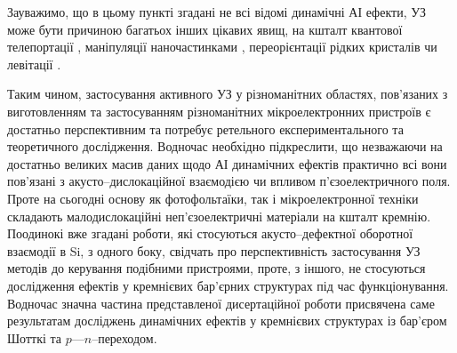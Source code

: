









Зауважимо, що в цьому пункті згадані не всі відомі динамічні АІ ефекти,
УЗ може бути причиною багатьох інших цікавих явищ, на кшталт квантової телепортації \cite{Buscemi}, маніпуляції наночастинками \cite{Cuberes,Olikh:SPQEO2010}, переорієнтації рідких кристалів \cite{US:levit} чи левітації \cite{US:levit}.

Таким чином, застосування активного УЗ у різноманітних областях, пов'язаних з виготовленням та застосуванням різноманітних мікроелектронних пристроїв є достатньо перспективним та потребує ретельного експериментального та теоретичного дослідження.
Водночас необхідно підкреслити, що незважаючи на достатньо великих масив даних щодо АІ динамічних ефектів практично всі вони пов'язані з акусто--дислокаційної взаємодією чи впливом п'єзоелектричного поля.
Проте на сьогодні основу як фотофольтаїки, так і мікроелектронної техніки складають малодислокаційні неп'єзоелектричні матеріали на кшталт кремнію.
Поодинокі вже згадані роботи, які стосуються акусто--дефектної оборотної взаємодії в Si, з одного боку,
свідчать про перспективність застосування УЗ методів до керування подібними пристроями,
проте, з іншого, не стосуються дослідження ефектів у кремнієвих бар'єрних структурах під час функціонування.
Водночас значна частина представленої дисертаційної роботи присвячена саме результатам досліджень динамічних ефектів у кремнієвих структурах із бар'єром Шотткі та $p$---$n$--переходом.


